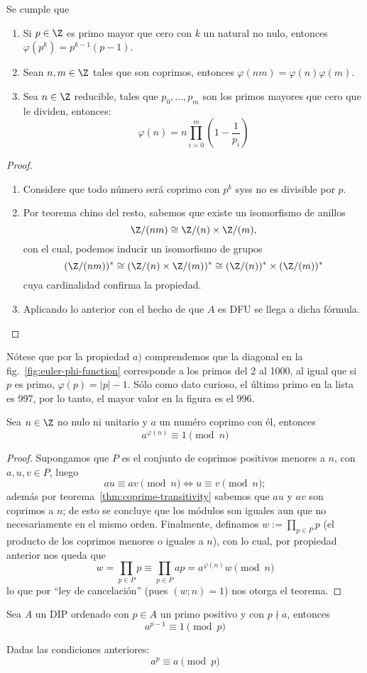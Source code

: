 \documentclass[11pt,oneside]{book}
\begin{document}
\begin{thm}
Se cumple que
	\begin{enumerate}[$a)$]
	\item Si $p\in\Z$ es primo mayor que cero con $k$ un natural no nulo, entonces $\varphi(p^k)=p^{k-1}(p-1)$.
	\item Sean $n,m\in\Z$ tales que son coprimos, entonces $\varphi(nm)=\varphi(n)\varphi(m)$.
	\item Sea $n\in\Z$ reducible, tales que $p_0,\dots,p_m$ son los primos mayores que cero que le dividen, entonces:
	$$\varphi(n)=n\prod_{i=0}^m\left(1-\frac{1}{p_i}\right)$$
	\end{enumerate}
\end{thm}
\begin{proof}
\begin{enumerate}
	\item Considere que todo número será coprimo con $p^k$ syss no es divisible por $p$.
	\item Por teorema chino del resto, sabemos que existe un isomorfismo de anillos
	$$\Z/(nm)\cong\Z/(n)\times\Z/(m),$$
	con el cual, podemos inducir un isomorfismo de grupos
	$$(\Z/(nm))^*\cong(\Z/(n)\times\Z/(m))^*\cong(\Z/(n))^*\times(\Z/(m))^*$$
	cuya cardinalidad confirma la propiedad.
	\item Aplicando lo anterior con el hecho de que $A$ es DFU se llega a dicha fórmula.
\end{enumerate}
\end{proof}
Nótese que por la propiedad $a)$ comprendemos que la diagonal en la fig.~\ref{fig:euler-phi-function} corresponde a los primos del 2 al 1000, al igual que si $p$ es primo, $\varphi(p)=|p|-1$. Sólo como dato curioso, el último primo en la lista es 997, por lo tanto, el mayor valor en la figura es el 996.
\begin{thm}
Sea $n\in \Z$ no nulo ni unitario y $a$ un numéro coprimo con él, entonces
$$a^{\varphi(n)}\equiv 1\pmod n$$
\end{thm}
\begin{proof}
Supongamos que $P$ es el conjunto de coprimos positivos menores a $n$, con $a,u,v\in P$, luego
$$au\equiv av\pmod{n}\iff u\equiv v\pmod{n};$$
además por teorema~\ref{thm:coprime-transitivity} sabemos que $au$ y $av$ son coprimos a $n$; de esto se concluye que los módulos son iguales aun que no necesariamente en el mismo orden. Finalmente, definamos $w:=\prod_{p\in P}p$ (el producto de los coprimos menores o iguales a $n$), con lo cual, por propiedad anterior nos queda que
$$w=\prod_{p\in P}p\equiv\prod_{p\in P}ap=a^{\varphi(n)}w\pmod n$$
lo que por ``ley de cancelación'' (pues $(w;n)=1$) nos otorga el teorema.
\end{proof}
\begin{thm}
Sea $A$ un DIP ordenado con $p\in A$ un primo positivo y con $p\nmid a$, entonces
$$a^{p-1}\equiv 1\pmod p$$
\end{thm}
\begin{cor}
Dadas las condiciones anteriores:
$$a^p\equiv a\pmod p$$
\end{cor}
\end{document}
